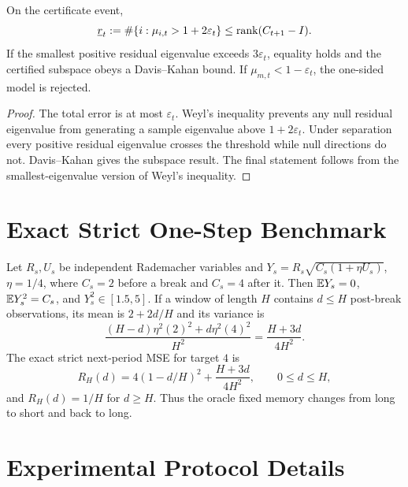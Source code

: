 \begin{proposition}
\label{prop:certificate-app}
On the certificate event,
\begin{equation}
 \underline r_t:=\#\{i:\mu_{i,t}>1+2\varepsilon_t\}
 \le\operatorname{rank}(C_{t+1}-I).
\end{equation}
If the smallest positive residual eigenvalue exceeds $3\varepsilon_t$, equality holds and the certified subspace obeys a Davis--Kahan bound.  If $\mu_{m,t}<1-\varepsilon_t$, the one-sided model is rejected.
\end{proposition}

\begin{proof}
The total error is at most $\varepsilon_t$.  Weyl's inequality prevents any null residual eigenvalue from generating a sample eigenvalue above $1+2\varepsilon_t$.  Under separation every positive residual eigenvalue crosses the threshold while null directions do not.  Davis--Kahan \citep{davis1970rotation} gives the subspace result.  The final statement follows from the smallest-eigenvalue version of Weyl's inequality.  \end{proof}

\section{Exact Strict One-Step Benchmark}
\label{app:benchmark}

Let $R_s,U_s$ be independent Rademacher variables and
$Y_s=R_s\sqrt{C_s(1+\eta U_s)}$, $\eta=1/4$, where $C_s=2$ before a break and $C_s=4$ after it.  Then $\mathbb E Y_s=0$, $\mathbb E Y_s^2=C_s$, and $Y_s^2\in[1.5,5]$.  If a window of length $H$ contains $d\le H$ post-break observations, its mean is $2+2d/H$ and its variance is
\begin{equation}
 \frac{(H-d)\eta^2(2)^2+d\eta^2(4)^2}{H^2}=\frac{H+3d}{4H^2}.
\end{equation}
The exact strict next-period MSE for target $4$ is
\begin{equation}
 R_H(d)=4(1-d/H)^2+\frac{H+3d}{4H^2},\qquad 0\le d\le H,
\end{equation}
and $R_H(d)=1/H$ for $d\ge H$.  Thus the oracle fixed memory changes from long to short and back to long.

\section{Experimental Protocol Details}
\label{app:experiments}

